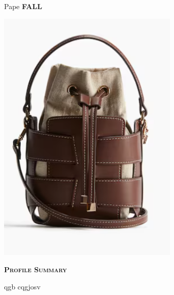 \documentclass[11pt,a4paper]{article}
\newcommand{\headleft}[1]{\vspace*{3ex}\textsc{\textbf{#1}}\par%
    \vspace*{-1.5ex}\hrulefill\par\vspace*{0.7ex}}
\begin{document}
\setlength{\topskip}{0pt}
\setlength{\parindent}{0pt}
\setlength{\parskip}{0pt}
\setlength{\fboxsep}{0pt}
\pagestyle{empty}
\raggedbottom

\begin{minipage}[t]{0.33\textwidth}
\colorbox{cvblue}{\begin{minipage}[t][5mm][t]{\textwidth}\null\hfill\null\end{minipage}}
\vspace{-0.2ex}
\colorbox{cvblue!90}{\color{white}%
\textwidth
\begin{minipage}[t][293mm][t]{0.82\textwidth}\raggedright
\vspace*{2.5ex}

\Large Pape \textbf{\textsc{FALL}}\normalsize

\null\hfill\includegraphics[width=0.65\textwidth]{5173b9bfdf704fe1b5da13e06e5912c9.png}\hfill\null

\vspace*{0.5ex}

\headleft{Profile Summary}
qgb cqgjosv 


\end{minipage}}
\end{minipage}
\end{document}
